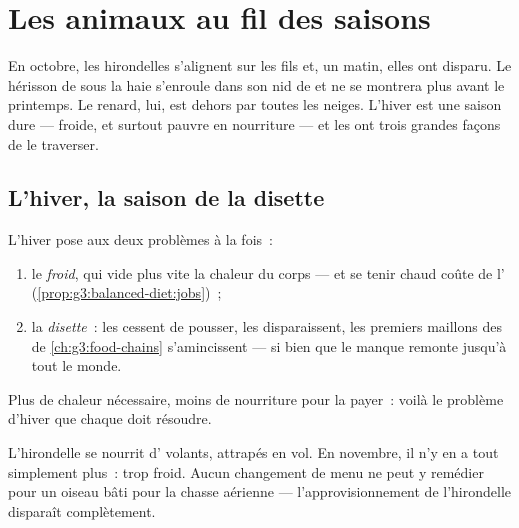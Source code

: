 \chapter{Les animaux au fil des saisons}\label{ch:g3:animals-through-seasons}

En octobre, les hirondelles s'alignent sur les fils et, un matin,
elles ont disparu. Le hérisson de sous la haie s'enroule dans son
nid de  et ne se montrera plus avant le printemps. Le
renard, lui, est dehors par toutes les neiges. L'hiver est une
saison dure --- froide, et surtout pauvre en nourriture --- et les
 ont trois grandes façons de le traverser.

\section{L'hiver, la saison de la disette}

\begin{proposition}\label{prop:g3:animals-through-seasons:problem}
L'hiver pose aux  deux problèmes à la fois~:
\begin{enumerate}
  \item le \emph{froid}, qui vide plus vite la chaleur du corps ---
        et se tenir chaud coûte de l'
        (\cref{prop:g3:balanced-diet:jobs})~;
  \item la \emph{disette}~: les  cessent de pousser, les
         disparaissent, les premiers maillons des  de \cref{ch:g3:food-chains} s'amincissent ---
        si bien que le manque remonte jusqu'à tout le monde.
\end{enumerate}
Plus de chaleur nécessaire, moins de nourriture pour la payer~:
voilà le problème d'hiver que chaque  doit résoudre.
\end{proposition}
\admitted

\begin{example}\label{ex:g3:animals-through-seasons:insects}
L'hirondelle se nourrit d' volants, attrapés en vol. En
novembre, il n'y en a tout simplement plus~: trop froid. Aucun
changement de menu ne peut y remédier pour un oiseau bâti pour la
chasse aérienne --- l'approvisionnement de l'hirondelle disparaît
complètement.
\end{example}

